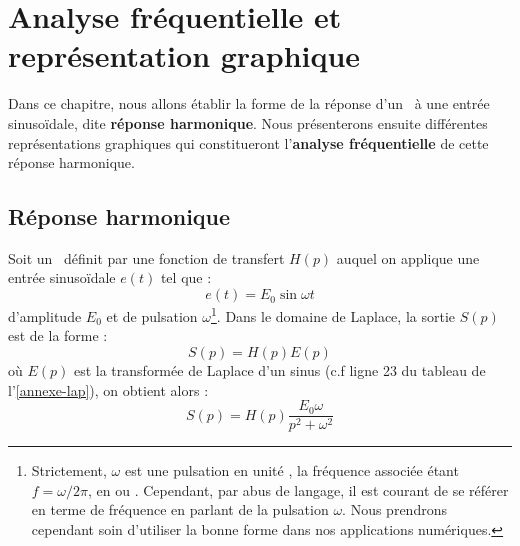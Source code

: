\chapter[Analyse fréquentielle]{Analyse fréquentielle et représentation graphique\label{chap-anafreq}}


Dans ce chapitre, nous allons établir la forme de la réponse d'un \SLCI~à une entrée sinuso\"idale, dite 
\textbf{réponse harmonique}.
Nous présenterons ensuite différentes représentations graphiques qui 
constitueront l'\textbf{analyse fréquentielle} 
de cette réponse harmonique.


\section{Réponse harmonique}


Soit un \SLCI~définit par une fonction de transfert $H(p)$ auquel on applique 
une entrée sinuso\"idale $e(t)$ tel que :
$$
e(t)=E_0\sin\omega t 
$$
d'amplitude $E_0$ et de pulsation $\omega$\footnote{Strictement, $\omega$ est une 
pulsation en unité \unit{}{\radian\per\second}, la fréquence associée étant $f=\omega/2\pi$, 
en \unit{}{\reciprocal\second} ou \unit{}{\hertz}. Cependant, 
par abus de langage, il est courant de se référer en terme de fréquence en parlant de la pulsation $\omega$. 
Nous prendrons cependant soin d'utiliser la bonne forme dans nos applications numériques.}.
Dans le domaine de Laplace, la sortie $S(p)$ est de la forme :
$$
S(p)=H(p)E(p)
$$
où $E(p)$ est la transformée de Laplace d'un sinus (c.f ligne 23 du tableau de l'\cref{annexe-lap}), 
on obtient alors :
$$
S(p)=H(p)\dfrac{E_0\omega}{p^2+\omega^2}
$$


